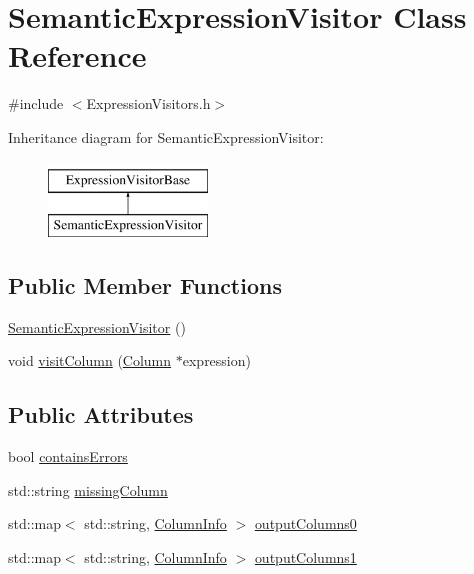 \hypertarget{class_semantic_expression_visitor}{\section{Semantic\+Expression\+Visitor Class Reference}
\label{class_semantic_expression_visitor}
}


{\ttfamily \#include $<$Expression\+Visitors.\+h$>$}

Inheritance diagram for Semantic\+Expression\+Visitor\+:\begin{figure}[H]
\begin{center}
\leavevmode
\includegraphics[height=2.000000cm]{class_semantic_expression_visitor}
\end{center}
\end{figure}
\subsection*{Public Member Functions}
\begin{DoxyCompactItemize}
\item 
\hyperlink{class_semantic_expression_visitor_a7b5310f2a8b97f2f370dc2a36239dcbf}{Semantic\+Expression\+Visitor} ()
\item 
void \hyperlink{class_semantic_expression_visitor_a5a669aa8f4ff78ca0bfd3aab0a4d11d9}{visit\+Column} (\hyperlink{class_column}{Column} $\ast$expression)
\end{DoxyCompactItemize}
\subsection*{Public Attributes}
\begin{DoxyCompactItemize}
\item 
bool \hyperlink{class_semantic_expression_visitor_a5355c2bd3477b4d33bc7ab5443408d11}{contains\+Errors}
\item 
std\+::string \hyperlink{class_semantic_expression_visitor_a2082ef4052d1c35fdda7bcc72c5bb132}{missing\+Column}
\item 
std\+::map$<$ std\+::string, \hyperlink{class_column_info}{Column\+Info} $>$ \hyperlink{class_semantic_expression_visitor_a38fc36443e4cabad8039ac58f9934780}{output\+Columns0}
\item 
std\+::map$<$ std\+::string, \hyperlink{class_column_info}{Column\+Info} $>$ \hyperlink{class_semantic_expression_visitor_aca4d42fbadc6310390ccdbe65a0356fd}{output\+Columns1}
\end{DoxyCompactItemize}


